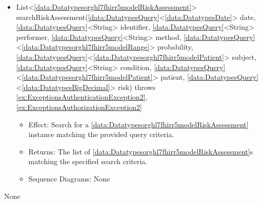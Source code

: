 \begin{description}
\begin{itemize}[noitemsep,nolistsep,leftmargin=-.25cm]
      \item \textsf{List\textless{}\ref{data:Datatypesorghl7fhirr5modelRiskAssessment}\textgreater{} searchRiskAssessment(\ref{data:DatatypesQuery}\textless{}\ref{data:DatatypesDate}\textgreater{} date, \ref{data:DatatypesQuery}\textless{}String\textgreater{} identifier, \ref{data:DatatypesQuery}\textless{}String\textgreater{} performer, \ref{data:DatatypesQuery}\textless{}String\textgreater{} method, \ref{data:DatatypesQuery}\textless{}\ref{data:Datatypesorghl7fhirr5modelRange}\textgreater{} probability, \ref{data:DatatypesQuery}\textless{}\ref{data:Datatypesorghl7fhirr5modelPatient}\textgreater{} subject, \ref{data:DatatypesQuery}\textless{}String\textgreater{} condition, \ref{data:DatatypesQuery}\textless{}\ref{data:Datatypesorghl7fhirr5modelPatient}\textgreater{} patient, \ref{data:DatatypesQuery}\textless{}\ref{data:DatatypesBigDecimal}\textgreater{} risk) throws \ref{ex:ExceptionsAuthenticationException2}, \ref{ex:ExceptionsAuthorizationException2}}
        \begin{itemize}[noitemsep,nolistsep]
           \item Effect: Search for a \ref{data:Datatypesorghl7fhirr5modelRiskAssessment} instance matching the provided query criteria. 
           \item Returns: The list of \ref{data:Datatypesorghl7fhirr5modelRiskAssessment}s matching the specified search criteria.
           \item Sequence Diagrams: None
        \end{itemize}
    \end{itemize}
      \item[Diagrams:] None
    \end{description}


